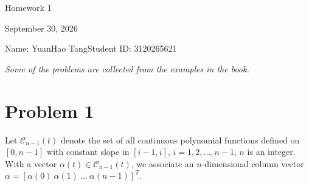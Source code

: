 \documentclass[UTF8,10pt,letterpaper,fontset=fandol]{ctexart}
\begin{document}
\begin{center}
{\LARGE Homework 1}\par
\vspace{0.6em}
September 30, 2026\par
Name: YuanHao Tang\quad Student ID: 3120265621
\end{center}
\begin{center}
\emph{Some of the problems are collected from the examples in the book.}
\end{center}

\section{Problem 1}
Let \(\mathcal C_{n-1}(t)\) denote the set of all continuous polynomial functions
defined on \([0,n-1]\) with constant slope in \([i-1,i]\),
\(i=1,2,\ldots,n-1\), \(n\) is an integer. With a vector
\(\alpha(t)\in\mathcal C_{n-1}(t)\), we associate an \(n\)-dimensional
column vector \(\alpha=[\alpha(0)\ \alpha(1)\ \ldots\ \alpha(n-1)]^T\).
\end{document}
